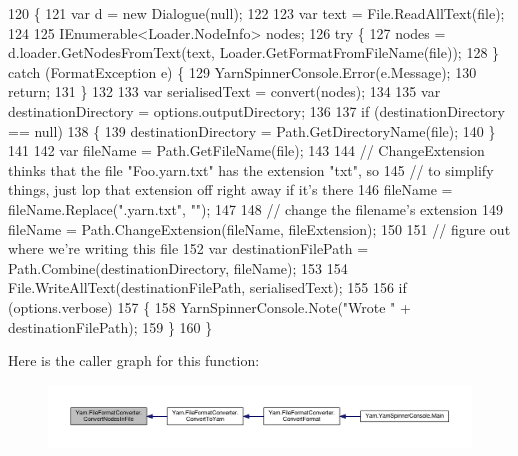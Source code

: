 \begin{DoxyCode}
120         \{
121             var d = \textcolor{keyword}{new} Dialogue(null);
122 
123             var text = File.ReadAllText(file);
124 
125             IEnumerable<Loader.NodeInfo> nodes;
126             \textcolor{keywordflow}{try} \{
127                 nodes = d.loader.GetNodesFromText(text, Loader.GetFormatFromFileName(file));
128             \} \textcolor{keywordflow}{catch} (FormatException e) \{
129                 YarnSpinnerConsole.Error(e.Message);
130                 \textcolor{keywordflow}{return};
131             \}
132 
133             var serialisedText = convert(nodes);
134 
135             var destinationDirectory = options.outputDirectory;
136 
137             \textcolor{keywordflow}{if} (destinationDirectory == null)
138             \{
139                 destinationDirectory = Path.GetDirectoryName(file);
140             \}
141 
142             var fileName = Path.GetFileName(file);
143 
144             \textcolor{comment}{// ChangeExtension thinks that the file "Foo.yarn.txt" has the extension "txt", so}
145             \textcolor{comment}{// to simplify things, just lop that extension off right away if it's there}
146             fileName = fileName.Replace(\textcolor{stringliteral}{".yarn.txt"}, \textcolor{stringliteral}{""});
147 
148             \textcolor{comment}{// change the filename's extension}
149             fileName = Path.ChangeExtension(fileName, fileExtension);
150 
151             \textcolor{comment}{// figure out where we're writing this file}
152             var destinationFilePath = Path.Combine(destinationDirectory, fileName);
153 
154             File.WriteAllText(destinationFilePath, serialisedText);
155 
156             \textcolor{keywordflow}{if} (options.verbose)
157             \{
158                 YarnSpinnerConsole.Note(\textcolor{stringliteral}{"Wrote "} + destinationFilePath);
159             \}
160         \}
\end{DoxyCode}


Here is the caller graph for this function\-:
\nopagebreak
\begin{figure}[H]
\begin{center}
\leavevmode
\includegraphics[width=350pt]{a00102_aa72838be584177b5592c31d73c0febdb_icgraph}
\end{center}
\end{figure}


